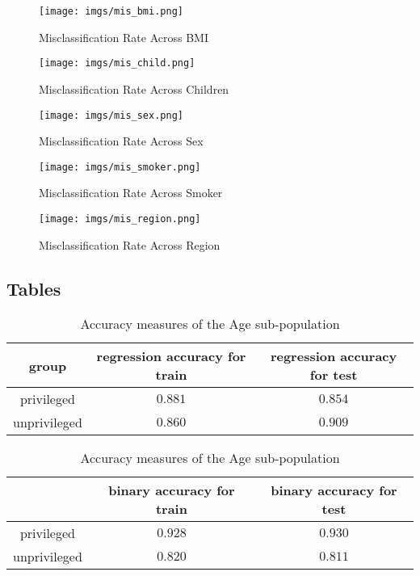 \documentclass[10pt]{article}
\begin{document}
\begin{figure}[h!]
    \centering
    \texttt{[image: imgs/mis\_bmi.png]}
    \caption{Misclassification Rate Across BMI}
    \label{fig:mis_bmi}
\end{figure}

\begin{figure}[h!]
    \centering
    \texttt{[image: imgs/mis\_child.png]}
    \caption{Misclassification Rate Across Children}
    \label{fig:mis_child}
\end{figure}

\begin{figure}[h!]
    \centering
    \texttt{[image: imgs/mis\_sex.png]}
    \caption{Misclassification Rate Across Sex}
    \label{fig:mis_sex}
\end{figure}

\begin{figure}[h!]
    \centering
    \texttt{[image: imgs/mis\_smoker.png]}
    \caption{Misclassification Rate Across Smoker}
    \label{fig:mis_smoker}
\end{figure}

\begin{figure}[h!]
    \centering
    \texttt{[image: imgs/mis\_region.png]}
    \caption{Misclassification Rate Across Region}
    \label{fig:mis_region}
\end{figure}

\FloatBarrier
\subsection{Tables}
\begin{table}[h!]
    \centering
    \begin{tabular}{c|c|c}
         group & regression accuracy for train& regression accuracy for test\\
         \hline
         \hline
         privileged & \(0.881\) & \(0.854\)\\
         \hline
         unprivileged & \(0.860\) & \(0.909\)
    \end{tabular}
    \vspace{3pt}
    \begin{tabular}{c|c|c}
          & \hphantom{re}binary accuracy for train\hphantom{re}& \hphantom{re}binary accuracy for test\hphantom{re}\\
         \hline
         \hline
         privileged & \(0.928\) & \(0.930\)\\
         \hline
         unprivileged & \(0.820\) & \(0.811\)
    \end{tabular}
    \vspace{3pt}
    \caption{Accuracy measures of the Age sub-population}
    \label{tab:acc_age}
\end{table}
\end{document}
